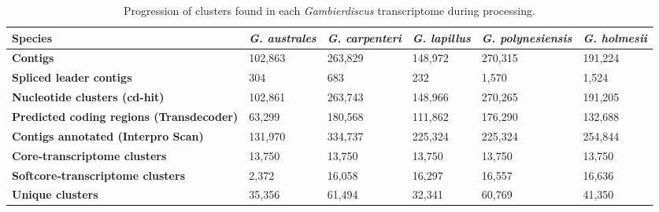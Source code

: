 \documentclass[12pt]{article}
\begin{document}
\begin{table}
\caption{Progression of clusters found in each \emph{Gambierdiscus} transcriptome during processing.}
\label{tbl:ClustTable}
\begin{tabular}{ | p{3cm} | p{2cm} | p{2.5cm} | p{2.5cm} | p{2cm} | p{2cm}|}
\hline
\textbf{Species}& \textit{G. australes}& \emph{G. carpenteri}&\emph{G. lapillus}&\emph{G. polynesiensis}&\emph{G. holmesii}\\
\hline
\textbf{Contigs}&102,863&263,829&148,972&270,315&191,224\\
\hline
\textbf{Spliced leader contigs}&304&683&232&1,570&1,524\\
\hline
\textbf{Nucleotide clusters (cd-hit)}&102,861&263,743&148,966&270,265&191,205\\
\hline
\textbf{Predicted coding regions (Transdecoder)}&63,299&180,568&111,862&176,290&132,688\\
\hline
\textbf{Contigs annotated (Interpro Scan)}&131,970&334,737&225,324&225,324&254,844\\ 
\hline
\textbf{Core-transcriptome clusters}&13,750&13,750&13,750&13,750&13,750\\
\hline
\textbf{Softcore-transcriptome clusters}&2,372&16,058&16,297&16,557&16,636\\
\hline
\textbf{Unique clusters}&35,356&61,494&32,341&60,769&41,350\\
\hline
\end{tabular}
\end{table}
\FloatBarrier
\newpage
\end{document}
